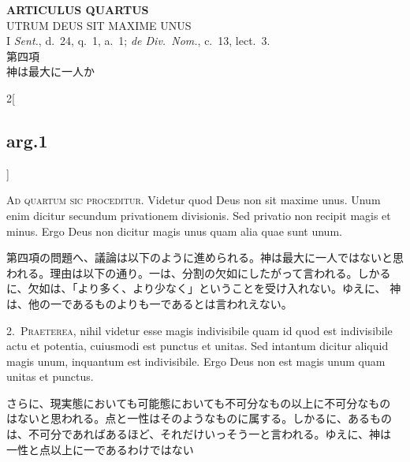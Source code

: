 \documentclass[paper=a4paper,fontsize=10pt,jafontsize=9pt,titlepage]{jlreq}
\begin{document}
\begin{center}
 {\Large {\bfseries ARTICULUS QUARTUS}}\\
 {\large UTRUM DEUS SIT MAXIME UNUS}\\
 {\footnotesize I {\itshape Sent.}, d.~24, q.~1, a.~1; {\itshape de
 Div.~Nom.}, c.~13, lect.~3.}\\
 {\Large 第四項\\神は最大に一人か}
\end{center}



{}
\setcounter{section}{4}
\setcounter{subsection}{0}

\begin{paracol}{2}[\subsection{arg.1}]

{\huge A}{\scshape d quartum sic proceditur}. Videtur quod Deus non sit
 maxime unus. Unum enim dicitur secundum privationem divisionis. Sed
 privatio non recipit magis et minus. Ergo Deus non dicitur magis unus
 quam alia quae sunt unum.

\switchcolumn

第四項の問題へ、議論は以下のように進められる。神は最大に一人ではないと思
われる。理由は以下の通り。一は、分割の欠如にしたがって言われる。しかる
に、欠如は、「より多く、より少なく」ということを受け入れない。ゆえに、
神は、他の一であるものよりも一であるとは言われえない。


2.~{\scshape Praeterea}, nihil videtur esse magis indivisibile quam id quod est
indivisibile actu et potentia, cuiusmodi est punctus et unitas. Sed
intantum dicitur aliquid magis unum, inquantum est indivisibile. Ergo
Deus non est magis unum quam unitas et punctus.

\switchcolumn

さらに、現実態においても可能態においても不可分なもの以上に不可分なもの
はないと思われる。点と一性はそのようなものに属する。しかるに、あるもの
は、不可分であればあるほど、それだけいっそう一と言われる。ゆえに、神は
一性と点以上に一であるわけではない



\end{paracol}
\end{document}
